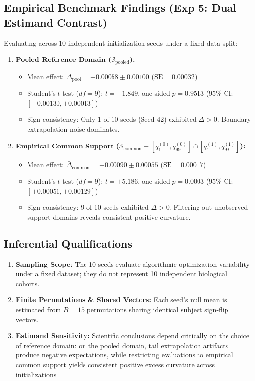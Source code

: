 \documentclass{article}
\begin{document}
\subsection*{Empirical Benchmark Findings (Exp 5: Dual Estimand Contrast)}
Evaluating across 10 independent initialization seeds under a fixed data split:
\begin{enumerate}
    \item \textbf{Pooled Reference Domain ($\mathcal{S}_{\mathrm{pooled}}$):}
    \begin{itemize}
        \item Mean effect: $\bar{\Delta}_{\mathrm{pool}} = -0.00058 \pm 0.00100$ ($\mathrm{SE} = 0.00032$)
        \item Student's $t$-test ($df=9$): $t = -1.849$, one-sided $p = 0.9513$ (95\% CI: $[-0.00130, +0.00013]$)
        \item Sign consistency: Only 1 of 10 seeds (Seed 42) exhibited $\Delta > 0$. Boundary extrapolation noise dominates.
    \end{itemize}
    \item \textbf{Empirical Common Support ($\mathcal{S}_{\mathrm{common}} = [q_1^{(0)}, q_{99}^{(0)}] \cap [q_1^{(1)}, q_{99}^{(1)}]$):}
    \begin{itemize}
        \item Mean effect: $\bar{\Delta}_{\mathrm{common}} = +0.00090 \pm 0.00055$ ($\mathrm{SE} = 0.00017$)
        \item Student's $t$-test ($df=9$): $t = +5.186$, one-sided $p = 0.0003$ (95\% CI: $[+0.00051, +0.00129]$)
        \item Sign consistency: 9 of 10 seeds exhibited $\Delta > 0$. Filtering out unobserved support domains reveals consistent positive curvature.
    \end{itemize}
\end{enumerate}

\subsection*{Inferential Qualifications}
\begin{enumerate}
    \item \textbf{Sampling Scope:} The 10 seeds evaluate algorithmic optimization variability under a fixed dataset; they do not represent 10 independent biological cohorts.
    \item \textbf{Finite Permutations \& Shared Vectors:} Each seed's null mean is estimated from $B=15$ permutations sharing identical subject sign-flip vectors.
    \item \textbf{Estimand Sensitivity:} Scientific conclusions depend critically on the choice of reference domain: on the pooled domain, tail extrapolation artifacts produce negative expectations, while restricting evaluations to empirical common support yields consistent positive excess curvature across initializations.
\end{enumerate}
\end{document}
